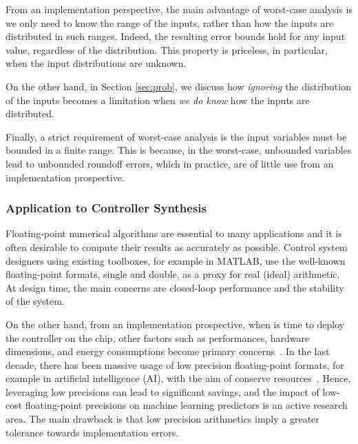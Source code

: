 %
From an implementation perspective, the main advantage of worst-case analysis is we only need to know the range of the inputs, rather than how the inputs are distributed in such ranges. 
%
Indeed, the resulting error bounds hold for any input value, regardless of the distribution.
%
%
This property is priceless, in particular, when the input distributions are unknown.
%

On the other hand, in Section \ref{sec:prob}, we discuss how \emph{ignoring} the distribution of the inputs becomes a limitation when \emph{we do know} how the inputs are distributed.
%

Finally, a strict requirement of worst-case analysis is the input variables must be bounded  in a finite range. This is because, in the worst-case, unbounded variables lead to unbounded roundoff errors, which in practice, are of little use from an implementation prospective.
\subsubsection{Application to Controller Synthesis}
Floating-point numerical algorithms are essential to many applications and it is often desirable to compute their results as accurately as possible.
%
Control system designers using existing toolboxes, for example in MATLAB, use the well-known floating-point formats, single and double, as a proxy for real (ideal) arithmetic. 
%
At design time, the main concerns are closed-loop performance and the stability of the system.
%

%
%
On the other hand, from an implementation prospective, when is time to deploy the controller on the chip, other factors such as performances, hardware dimensions, and energy consumptions become primary concerns~\cite{suardi}.
%
In the last decade, there has been massive usage of low precision floating-point formats, for example in artificial intelligence (AI), with the aim of conserve resources~\cite{fppower}.
%
Hence, leveraging low precisions can lead to significant savings, and the impact of low-cost floating-point precisions on machine learning predictors is an active research area.
%
The main drawback is that low precision arithmetics imply a greater tolerance towards implementation errors.
%

